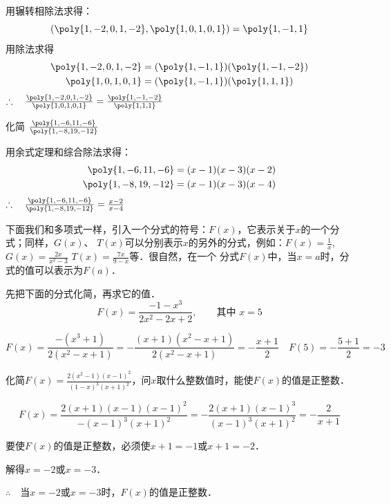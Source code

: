 \begin{solution}
    用辗转相除法求得：
\[(\poly{1,-2,0,1,-2}, \poly{1,0,1,0,1})=\poly{1,-1,1}\]
用除法求得
\[\begin{split}
    \poly{1,-2,0,1,-2}&=(\poly{1,-1,1})(\poly{1,-1,-2})\\
    \poly{1,0,1,0,1}&=(\poly{1,-1,1})(\poly{1,1,1})
\end{split}\]
$\therefore\quad \frac{\poly{1,-2,0,1,-2}}{\poly{1,0,1,0,1}}=\frac{\poly{1,-1,-2}}{\poly{1,1,1}}$
\end{solution}

\begin{example}
    化简 $\frac{\poly{1,-6,11,-6}}{\poly{1,-8,19,-12}}$  
\end{example}

\begin{solution}
用余式定理和综合除法求得：
\[\begin{split}
    \poly{1,-6,11,-6}&=(x-1)(x-3)(x-2)\\
    \poly{1,-8,19,-12}&=(x-1)(x-3)(x-4)
\end{split}\]
$\therefore\quad \frac{\poly{1,-6,11,-6}}{\poly{1,-8,19,-12}}=\frac{x-2}{x-4}$
\end{solution}

下面我们和多项式一样，引入一个分式的符号：$F(x)$，它表示关于$x$的一个分式；同样，$G(x)$、
$T(x)$可以分别表示$x$的另外的分式，例如：$F(x)=\frac{1}{x}$, $G(x)=\frac{2x}{x^2-3}$
$T (x) =\frac{7x}{9-x}$等．很自然，在一个
分式$F(x)$中，当$x=a$时，分式的值可以表示为$F (a)$．

\begin{example}
    先把下面的分式化简，再求它的值．
    \[F(x)=\frac{-1-x^3}{2x^2-2x+2},\qquad \text{其中 } x=5 \]
\end{example}
\begin{solution}
    \[
        F(x)=\frac{-(x^3+1)}{2(x^2-x+1)}=-\frac{(x+1)(x^2-x+1)}{2(x^2-x+1)}=-\frac{x+1}{2}\quad        
F(5)=-\frac{5+1}{2}=-3
    \]
\end{solution}

\begin{example}
    化简$F(x)=\frac{2(x^2-1)(x-1)^2}{(1-x)^3(x+1)^2}$，问$x$取什么整数值时，能使$F(x)$的值是正整数．
\end{example}

\begin{solution}
    \[
        F(x)=\frac{2(x+1)(x-1)(x-1)^2}{-(x-1)^3 (x+1)^2}
        =-\frac{2(x+1)(x-1)^3}{(x-1)^3(x+1)^2}
        =-\frac{2}{x+1}
    \]

    要使$F(x)$的值是正整数，必须使$x+1=-1$或$x+1=-2$．

    解得$x=-2$或$x=-3$．

    $\therefore\quad $当$x=-2$或$x=-3$时，$F(x)$的值是正整数．
\end{solution}

